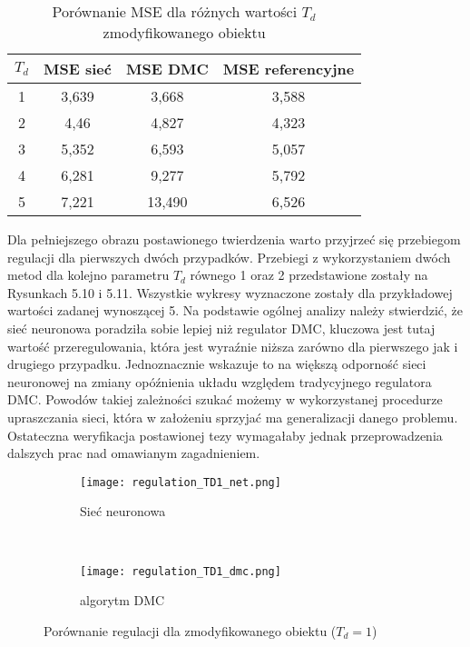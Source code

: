 \begin{table}[!htb] \label{tab:tabela3} \centering
\caption{Porównanie MSE dla różnych wartości \(T_d\) zmodyfikowanego obiektu}
\begin{tabular} {| c | c | c | c |} \hline
    \(T_d\) & MSE sieć & MSE DMC & MSE referencyjne \\ \hline\hline
    1 & 3,639 & 3,668 & 3,588 \\ \hline
    2 & 4,46 & 4,827 & 4,323 \\ \hline
    3 & 5,352 & 6,593 & 5,057 \\ \hline
    4 & 6,281 & 9,277 & 5,792 \\ \hline
    5 & 7,221 & 13,490 & 6,526 \\ \hline
\end{tabular}
\end{table}

\par Dla pełniejszego obrazu postawionego twierdzenia warto przyjrzeć się przebiegom regulacji dla pierwszych dwóch przypadków. Przebiegi z wykorzystaniem dwóch metod dla kolejno parametru \(T_d\) równego 1 oraz 2 przedstawione zostały na Rysunkach 5.10 i 5.11. Wszystkie wykresy wyznaczone zostały dla przykładowej wartości zadanej wynoszącej 5. Na podstawie ogólnej analizy należy stwierdzić, że sieć neuronowa poradziła sobie lepiej niż regulator DMC, kluczowa jest tutaj wartość przeregulowania, która jest wyraźnie niższa zarówno dla pierwszego jak i drugiego przypadku. Jednoznacznie wskazuje to na większą odporność sieci neuronowej na zmiany opóźnienia układu względem tradycyjnego regulatora DMC. Powodów takiej zależności szukać możemy w wykorzystanej procedurze upraszczania sieci, która w założeniu sprzyjać ma generalizacji danego problemu. Ostateczna weryfikacja postawionej tezy wymagałaby jednak przeprowadzenia dalszych prac nad omawianym zagadnieniem. 

\begin{figure}[!htb]
    \centering
    \begin{subfigure}[t]{0.5\textwidth}
        \centering
        \texttt{[image: regulation\_TD1\_net.png]}
        \caption{Sieć neuronowa}
    \end{subfigure}%
    ~ 
    \begin{subfigure}[t]{0.5\textwidth}
        \centering
        \texttt{[image: regulation\_TD1\_dmc.png]}
        \caption{algorytm DMC}
    \end{subfigure}
    \caption{Porównanie regulacji dla zmodyfikowanego obiektu (\(T_d=1\))}
\end{figure}

